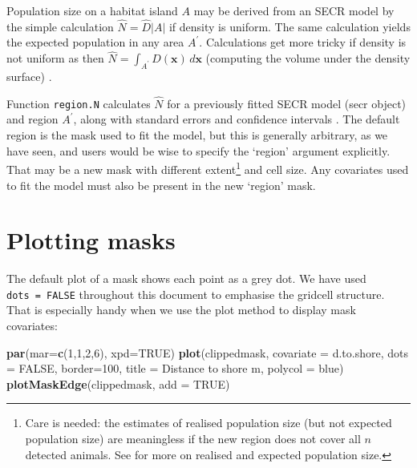 \documentclass[
]{book}
\newenvironment{Shaded}{\begin{snugshade}}{\end{snugshade}}
\newcommand{\AttributeTok}[1]{\textcolor[rgb]{0.13,0.29,0.53}{#1}}
\newcommand{\ConstantTok}[1]{\textcolor[rgb]{0.56,0.35,0.01}{#1}}
\newcommand{\DecValTok}[1]{\textcolor[rgb]{0.00,0.00,0.81}{#1}}
\newcommand{\FunctionTok}[1]{\textcolor[rgb]{0.13,0.29,0.53}{\textbf{#1}}}
\newcommand{\NormalTok}[1]{#1}
\newcommand{\StringTok}[1]{\textcolor[rgb]{0.31,0.60,0.02}{#1}}
\begin{document}
Population size on a habitat island \(A\) may be derived from an SECR model by the simple calculation \(\hat N = \hat D|A|\) if density is uniform. The same calculation yields the expected population in any area \(A^\prime\). Calculations get more tricky if density is not uniform as then \(\hat N = \int_{A^\prime} D(\mathbf{x}) \, d\mathbf{x}\) (computing the volume under the density surface) \citep{ef13}.

Function \texttt{region.N} calculates \(\hat N\) for a previously fitted SECR model (secr object) and region \(A^\prime\), along with standard errors and confidence intervals \citep{ef13}. The default region is the mask used to fit the model, but this is generally arbitrary, as we have seen, and users would be wise to specify the `region' argument explicitly. That may be a new mask with different extent\footnote{Care is needed: the estimates of realised population size (but not expected population size) are meaningless if the new region does not cover all \(n\) detected animals. See \citet{ef13} for more on realised and expected population size.} and cell size. Any covariates used to fit the model must also be present in the new `region' mask.

\section{Plotting masks}\label{plotting-masks}

The default plot of a mask shows each point as a grey dot. We have used \texttt{dots\ =\ FALSE} throughout this document to emphasise the gridcell structure. That is especially handy when we use the plot method to display mask covariates:

\begin{Shaded}
\begin{Highlighting}[]
\FunctionTok{par}\NormalTok{(}\AttributeTok{mar=}\FunctionTok{c}\NormalTok{(}\DecValTok{1}\NormalTok{,}\DecValTok{1}\NormalTok{,}\DecValTok{2}\NormalTok{,}\DecValTok{6}\NormalTok{), }\AttributeTok{xpd=}\ConstantTok{TRUE}\NormalTok{)}
\FunctionTok{plot}\NormalTok{(clippedmask, }\AttributeTok{covariate =} \StringTok{\textquotesingle{}d.to.shore\textquotesingle{}}\NormalTok{, }\AttributeTok{dots =} \ConstantTok{FALSE}\NormalTok{, }
    \AttributeTok{border=}\DecValTok{100}\NormalTok{, }\AttributeTok{title =} \StringTok{\textquotesingle{}Distance to shore m\textquotesingle{}}\NormalTok{, }\AttributeTok{polycol =} \StringTok{\textquotesingle{}blue\textquotesingle{}}\NormalTok{)}
\FunctionTok{plotMaskEdge}\NormalTok{(clippedmask, }\AttributeTok{add =} \ConstantTok{TRUE}\NormalTok{)}
\end{Highlighting}
\end{Shaded}
\end{document}
